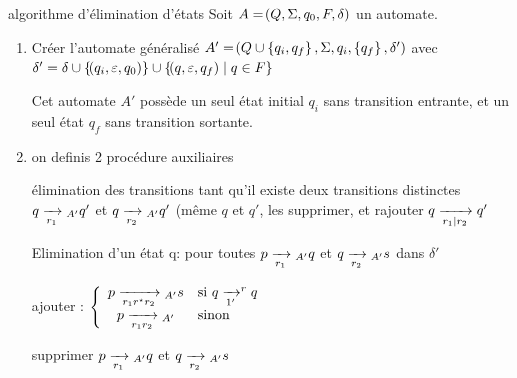     \begin{definition}{algorithme d'élimination d'états}{}
        Soit $A = \!\left(Q, \Sigma, q_0, F, \delta\right)$ un automate.
        \begin{enumerate}
            \item Créer l'automate généralisé $A' = \!\left(Q \cup \left\{q_i, q_f\right\}, \Sigma, q_i, \left\{q_f\right\}, \delta'\right)$ avec $\delta' = \delta \cup\left\{\!\left(q_i, \varepsilon, q_0\right)\right\} \cup \left\{\!\left(q, \varepsilon, q_f\right) \;\middle\vert\; q \in F\right\}$
            
            Cet automate $A'$ possède un seul état initial $q_i$ sans transition entrante, et un seul état $q_f$ sans transition sortante.
        
            \item on definis 2 procédure auxiliaires
            \begin{enumerate}
                \itt  élimination des transitions tant qu'il existe deux transitions distinctes $q \lima{r_1}{}_{A'} q'$ et $q \lima{r_2}{}_{A'} q'$ (même $q$ et $q'$, les supprimer, et rajouter $q \lima{r_1 \vert r_2}{} q'$
            
                \itt Elimination d'un état q: pour toutes $p \lima{r_1}{}_{A'} q$ et $q \lima{r_2}{}_{A'} s$ dans $\delta'$
                    \begin{enumerate}
                        \itt ajouter : $\left\lbrace\begin{array}{cl}
                            p \lima{r_1 r^\star r_2}{}_{A'} s &\text{si} \ q \lima{1'}^r q\\ %
                            p \lima{r_1 r_2}{}_{A'} & \text{sinon}
                        \end{array}\right.$ 
                        
                        
                        
                
                        \itt supprimer $p \lima{r_1}{}_{A'} q$ et $q \lima{r_2}{}_{A'} s$
                        

\end{enumerate}
\end{enumerate}
\end{enumerate}
\end{definition}
